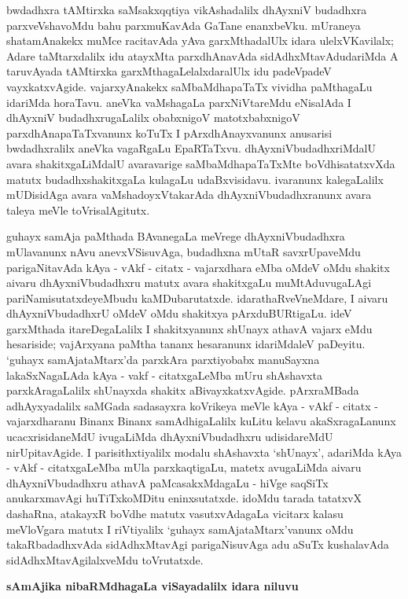 bwdadhxra tAMtirxka saMsakxqqtiya vikAshadalilx dhAyxniV budadhxra parxveVshavoMdu bahu parxmuKavAda GaTane enanxbeVku. mUraneya shatamAnakekx muMce racitavAda yAva garxMthadalUlx idara ulelxVKavilalx; Adare taMtarxdalilx idu atayxMta parxdhAnavAda sidAdhxMtavAdudariMda A taruvAyada tAMtirxka garxMthagaLelalxdaralUlx idu padeVpadeV vayxkatxvAgide. vajarxyAnakekx saMbaMdhapaTaTx vividha paMthagaLu idariMda horaTavu. aneVka vaMshagaLa parxNiVtareMdu eNisalAda I dhAyxniV budadhxrugaLalilx obabxnigoV matotxbabxnigoV parxdhAnapaTaTxvanunx koTuTx I pArxdhAnayxvanunx anusarisi bwdadhxralilx aneVka vagaRgaLu EpaRTaTxvu. dhAyxniVbudadhxriMdalU avara shakitxgaLiMdalU avaravarige saMbaMdhapaTaTxMte boVdhisatatxvXda matutx budadhxshakitxgaLa kulagaLu udaBxvisidavu. ivaranunx kalegaLalilx mUDisidAga avara vaMshadoyxVtakarAda dhAyxniVbudadhxranunx avara taleya meVle toVrisalAgitutx.

guhayx samAja paMthada BAvanegaLa meVrege dhAyxniVbudadhxra mUlavanunx nAvu anevxVSisuvAga, budadhxna mUtaR savxrUpaveMdu parigaNitavAda kAya - vAkf - citatx - vajarxdhara eMba oMdeV oMdu shakitx aivaru dhAyxniVbudadhxru matutx avara shakitxgaLu muMtAduvugaLAgi pariNamisutatxdeyeMbudu kaMDubarutatxde. idarathaRveVneMdare, I aivaru dhAyxniVbudadhxrU oMdeV oMdu shakitxya pArxduBURtigaLu. ideV garxMthada itareDegaLalilx I shakitxyanunx shUnayx athavA vajarx eMdu hesariside; vajArxyana paMtha tananx hesaranunx idariMdaleV paDeyitu. `guhayx samAjataMtarx'da parxkAra parxtiyobabx manuSayxna lakaSxNagaLAda kAya - vakf - citatxgaLeMba mUru shAshavxta parxkAragaLalilx shUnayxda shakitx aBivayxkatxvAgide. pArxraMBada adhAyxyadalilx saMGada sadasayxra koVrikeya meVle kAya - vAkf - citatx - vajarxdharanu Binanx Binanx samAdhigaLalilx kuLitu kelavu akaSxragaLanunx ucacxrisidaneMdU ivugaLiMda dhAyxniVbudadhxru udisidareMdU nirUpitavAgide. I parisithxtiyalilx modalu shAshavxta `shUnayx', adariMda kAya - vAkf - citatxgaLeMba mUla parxkaqtigaLu, matetx avugaLiMda aivaru dhAyxniVbudadhxru athavA paMcasakxMdagaLu - hiVge saqSiTx anukarxmavAgi huTiTxkoMDitu eninxsutatxde. idoMdu tarada tatatxvX dashaRna, atakayxR boVdhe matutx vasutxvAdagaLa vicitarx kalasu meVloVgara matutx I riVtiyalilx `guhayx samAjataMtarx'vanunx oMdu takaRbadadhxvAda sidAdhxMtavAgi parigaNisuvAga adu aSuTx kushalavAda sidAdhxMtavAgilalxveMdu toVrutatxde.

\newpage

\begin{center}
{\Large\bf sAmAjika nibaRMdhagaLa viSayadalilx idara niluvu}
\end{center}

